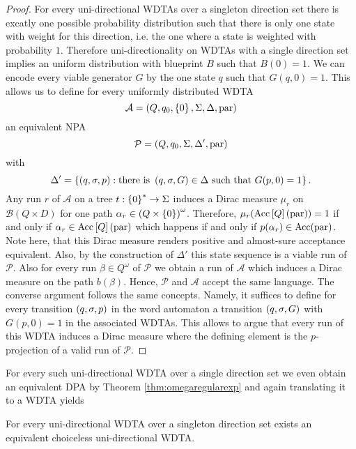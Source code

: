 \begin{proof}
  For every uni-directional \acp{WDTA} over a singleton direction set
  there is excatly one possible probability distribution such that there is
  only one state with weight for this direction, i.e. the one where a state is
  weighted with probability $1$. Therefore uni-directionality on \acp{WDTA}
  with a single direction set implies an uniform distribution with blueprint
  $B$ such that $B(0) = 1$. We can encode every viable generator $G$ by the one
  state $q$ such that $G(q,0) = 1$. This allows us to define for every
  uniformly distributed \ac{WDTA}
  \begin{equation*}
    \mathcal{A} = \left(Q, q_{0}, \left\{0\right\}, \Sigma, \Delta, \operatorname{par}\right)
  \end{equation*}
  an equivalent \ac{NPA}
  \begin{equation*}
    \mathcal{P} = \left(Q, q_{0}, \Sigma, \Delta', \operatorname{par}\right)
  \end{equation*}
  with
  \begin{equation*}
    \Delta' = \left\{
      \left(q,\sigma,p\right): \text{there is }\left(q,\sigma,G\right)\in\Delta
        \text{ such that }G(p,0) = 1
    \right\}.
  \end{equation*}
  Any run $r$ of $\mathcal{A}$ on a tree $t:\left\{0\right\}^{*}\rightarrow\Sigma$ 
  induces a Dirac measure $\mu_{r}$ on $\mathcal{B}(Q\times D)$ for one path 
  $\alpha_{r}\in\left(Q\times \left\{0\right\}\right)^{\omega}$.
  Therefore, $\mu_{r}(\operatorname{Acc}\left[Q\right](\operatorname{par})) = 1$ if and only if
  $\alpha_{r}\in\operatorname{Acc}\left[Q\right](\operatorname{par})$ which happens if and only if 
  $p(\alpha_{r})\in\operatorname{Acc}(\operatorname{par})$. Note here, that this Dirac measure renders
  positive and almost-sure acceptance equivalent. Also, by the construction of
  $\Delta'$ this state sequence is a viable run of $\mathcal{P}$. Also for
  every run $\beta\in Q^{\omega}$ of $\mathcal{P}$ we obtain a run of
  $\mathcal{A}$ which induces a Dirac measure on the path
  $b(\beta)$. Hence, $\mathcal{P}$ and $\mathcal{A}$ accept the same language.
  The converse argument follows the same concepts. Namely, it suffices to
  define for every transition $\left(q,\sigma, p\right)$ in the word automaton a
  transition $\left(q,\sigma,G\right)$ with $G(p, 0) = 1$ in the associated
  \acp{WDTA}. This allows to argue that every run of this \ac{WDTA} induces a
  Dirac measure where the defining element is the $p$-projection of a valid run
  of $\mathcal{P}$.
\end{proof}

For every such uni-directional \ac{WDTA} over a single direction set we even 
obtain an equivalent \ac{DPA} by Theorem \ref{thm:omegaregularexp} and again
translating it to a \ac{WDTA} yields
\begin{corollary}
  For every uni-directional \ac{WDTA} over a singleton direction set exists
  an equivalent choiceless uni-directional \ac{WDTA}.
\end{corollary}

